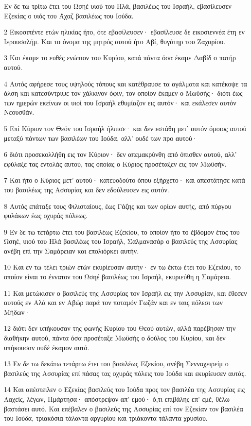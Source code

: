\par Εν δε τω τρίτω έτει του Ωσηέ υιού του Ηλά, βασιλέως του Ισραήλ, εβασίλευσεν Εζεκίας ο υιός του Άχαζ βασιλέως του Ιούδα.
\par 2 Εικοσιπέντε ετών ηλικίας ήτο, ότε εβασίλευσεν· εβασίλευσε δε εικοσιεννέα έτη εν Ιερουσαλήμ. Και το όνομα της μητρός αυτού ήτο Αβί, θυγάτηρ του Ζαχαρίου.
\par 3 Και έκαμε το ευθές ενώπιον του Κυρίου, κατά πάντα όσα έκαμε Δαβίδ ο πατήρ αυτού.
\par 4 Αυτός αφήρεσε τους υψηλούς τόπους και κατέθραυσε τα αγάλματα και κατέκοψε τα άλση και κατεσύντριψε τον χάλκινον όφιν, τον οποίον έκαμεν ο Μωϋσής· διότι έως των ημερών εκείνων οι υιοί του Ισραήλ εθυμίαζον εις αυτόν· και εκάλεσεν αυτόν Νεουσθάν.
\par 5 Επί Κύριον τον Θεόν του Ισραήλ ήλπισε· και δεν εστάθη μετ' αυτόν όμοιος αυτού μεταξύ πάντων των βασιλέων του Ιούδα, αλλ' ουδέ των προ αυτού·
\par 6 διότι προσεκολλήθη εις τον Κύριον· δεν απεμακρύνθη από όπισθεν αυτού, αλλ' εφύλαξε τας εντολάς αυτού, τας οποίας ο Κύριος προσέταξεν εις τον Μωϋσήν.
\par 7 Και ήτο ο Κύριος μετ' αυτού· κατευοδούτο όπου εξήρχετο· και απεστάτησε κατά του βασιλέως της Ασσυρίας και δεν εδούλευσεν εις αυτόν.
\par 8 Αυτός επάταξε τους Φιλισταίους, έως Γάζης και των ορίων αυτής, από πύργου φυλάκων έως οχυράς πόλεως.
\par 9 Εν δε τω τετάρτω έτει του βασιλέως Εζεκίου, το οποίον ήτο το έβδομον έτος του Ωσηέ, υιού του Ηλά βασιλέως του Ισραήλ, Σαλμανασάρ ο βασιλεύς της Ασσυρίας ανέβη επί την Σαμάρειαν και επολιόρκει αυτήν.
\par 10 Και εν τω τέλει τριών ετών εκυρίευσαν αυτήν· εν τω έκτω έτει του Εζεκίου, το οποίον είναι το έννατον του Ωσηέ βασιλέως του Ισραήλ, εκυριεύθη η Σαμάρεια.
\par 11 Και μετώκισεν ο βασιλεύς της Ασσυρίας τον Ισραήλ εις την Ασσυρίαν, και έθεσεν αυτούς εν Αλά και εν Αβώρ παρά τον ποταμόν Γωζάν και εν ταις πόλεσι των Μήδων·
\par 12 διότι δεν υπήκουσαν της φωνής Κυρίου του Θεού αυτών, αλλά παρέβησαν την διαθήκην αυτού, πάντα όσα προσέταξε Μωϋσής ο δούλος του Κυρίου, και δεν υπήκουσαν ουδέ έκαμον αυτά.
\par 13 Εν δε τω δεκάτω τετάρτω έτει του βασιλέως Εζεκίου, ανέβη Σενναχειρείμ ο βασιλεύς της Ασσυρίας επί πάσας τας οχυράς πόλεις του Ιούδα και εκυρίευσεν αυτάς.
\par 14 Και απέστειλεν ο Εζεκίας βασιλεύς του Ιούδα προς τον βασιλέα της Ασσυρίας εις Λαχείς, λέγων, Ημάρτησα· απόστρεψον απ' εμού· ό,τι επιβάλης επ' εμέ, θέλω βαστάσει αυτό. Και επέβαλεν ο βασιλεύς της Ασσυρίας επί τον Εζεκίαν τον βασιλέα του Ιούδα, τριακόσια τάλαντα αργυρίου και τριάκοντα τάλαντα χρυσίου.
